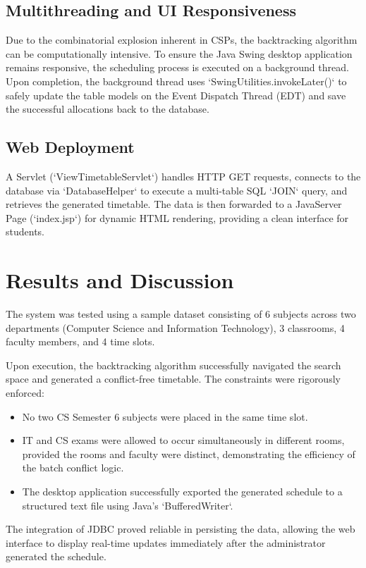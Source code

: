 \documentclass[conference]{IEEEtran}
\begin{document}
\subsection{Multithreading and UI Responsiveness}
Due to the combinatorial explosion inherent in CSPs, the backtracking algorithm can be computationally intensive. To ensure the Java Swing desktop application remains responsive, the scheduling process is executed on a background thread. 
Upon completion, the background thread uses `SwingUtilities.invokeLater()` to safely update the table models on the Event Dispatch Thread (EDT) and save the successful allocations back to the database.

\subsection{Web Deployment}
A Servlet (`ViewTimetableServlet`) handles HTTP GET requests, connects to the database via `DatabaseHelper` to execute a multi-table SQL `JOIN` query, and retrieves the generated timetable. The data is then forwarded to a JavaServer Page (`index.jsp`) for dynamic HTML rendering, providing a clean interface for students.

\section{Results and Discussion}
The system was tested using a sample dataset consisting of 6 subjects across two departments (Computer Science and Information Technology), 3 classrooms, 4 faculty members, and 4 time slots.

Upon execution, the backtracking algorithm successfully navigated the search space and generated a conflict-free timetable. The constraints were rigorously enforced:
\begin{itemize}
    \item No two CS Semester 6 subjects were placed in the same time slot.
    \item IT and CS exams were allowed to occur simultaneously in different rooms, provided the rooms and faculty were distinct, demonstrating the efficiency of the batch conflict logic.
    \item The desktop application successfully exported the generated schedule to a structured text file using Java's `BufferedWriter`.
\end{itemize}

The integration of JDBC proved reliable in persisting the data, allowing the web interface to display real-time updates immediately after the administrator generated the schedule.
\end{document}

